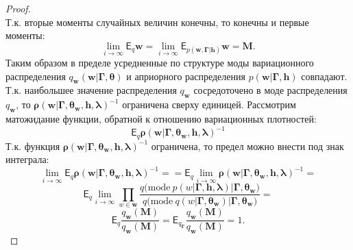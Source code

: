 \begin{proof}
\[\]
Т.к. вторые моменты случайных величин конечны, то конечны и первые моменты:
\[
  \lim_{i \to \infty} \mathsf{E}_{q}\mathbf{w}= \lim_{i \to \infty}\mathsf{E}_{p(\mathbf{w},\boldsymbol{\Gamma}|\mathbf{h})}\mathbf{w} = \mathbf{M}.
\]
Таким образом в пределе усредненные по структуре моды вариационного распределения $q_\mathbf{w}(\mathbf{w}|\boldsymbol{\Gamma}, \boldsymbol{\theta})$ и априорного распределения $p(\mathbf{w}|\boldsymbol{\Gamma}, \mathbf{h})$ совпадают.
Т.к. наибольшее значение распределения $q_\mathbf{w}$ сосредоточено в моде распределения $q_\mathbf{w}$, то $\boldsymbol{\rho}(\mathbf{w}|\boldsymbol{\Gamma}, \boldsymbol{\theta}_\mathbf{w}, \mathbf{h},\boldsymbol{\lambda})^{-1}$ ограничена сверху единицей. Рассмотрим матожидание функции, обратной к отношению вариационных плотностей:
\[
\mathsf{E}_q \boldsymbol{\rho}(\mathbf{w}|\boldsymbol{\Gamma}, \boldsymbol{\theta}_\mathbf{w}, \mathbf{h},\boldsymbol{\lambda})^{-1}
\] 
Т.к. функция $\boldsymbol{\rho}(\mathbf{w}|\boldsymbol{\Gamma}, \boldsymbol{\theta}_\mathbf{w}, \mathbf{h},\boldsymbol{\lambda})^{-1}$  ограничена, то предел можно внести под знак интеграла:
\[
\lim_{i \to \infty} \mathsf{E}_q \boldsymbol{\rho}(\mathbf{w}|\boldsymbol{\Gamma}, \boldsymbol{\theta}_\mathbf{w}, \mathbf{h},\boldsymbol{\lambda})^{-1} = 
 =\mathsf{E}_q  \lim_{i \to \infty}  \boldsymbol{\rho}(\mathbf{w}|\boldsymbol{\Gamma}, \boldsymbol{\theta}_\mathbf{w}, \mathbf{h},\boldsymbol{\lambda})^{-1} =
\]
\[
    \mathsf{E}_q \lim_{i \to \infty} \prod_{w \in \mathbf{w}}\frac{q\bigl(\text{mode}~p\left({w}|\boldsymbol{\Gamma}, \mathbf{h},\boldsymbol{\lambda}\right)|\boldsymbol{\Gamma},\boldsymbol{\theta}_\mathbf{w}\bigr)}{q\bigl(\text{mode}~q\left(w|\boldsymbol{\Gamma}, \boldsymbol{\theta}_\mathbf{w}\right)|\boldsymbol{\Gamma}, \boldsymbol{\theta}_\mathbf{w}\bigr)}=
\]
\[
     \mathsf{E}_q \frac{q_\mathbf{w}(\mathbf{M})}{q_\mathbf{w}(\mathbf{M})} = \mathsf{E}_{q_{\boldsymbol{\Gamma}}}\frac{q_\mathbf{w}(\mathbf{M})}{q_\mathbf{w}(\mathbf{M})} = 1.
\]

\end{proof}

